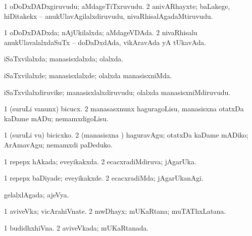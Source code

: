 \bentry
{} 
\gl{\nA}
\expl{}
\bmng
\bnum
\num{1} oDoDxDADxgiruvudu; aMdageTiTxruvudu. 
\num{2} anivARhayxte; baLakege, hiDitakekx -- anukUlavAgilalxdiruvudu, nivaRhisalAgadaMtiruvudu. 
\enum
\emng
\eentry

\bentry
{} 
\gl{\gu}
\bmng
\bnum
\num{1} oDoDxDADxda; nAjUkilalxda; aMdageVDAda. 
\num{2} nivaRhisalu anukUlavalalxdaSuTx -- doDaDxdAda, vikAravAda yA tUkavAda. 
\enum
\emng
\eentry

\bentry
{} 
\gl{\gu}
\expl{}
\bmng
iSaTxvilalxda; manasisxlalxda; olalxda. 
\emng
\eentry

\bentry
{} 
\gl{\kirxvi}
\expl{}
\bmng
iSaTxvilalxde; manasisxlalxde; olalxda manasisxniMda. 
\emng
\eentry

\bentry
{} 
\gl{\nA}
\expl{}
\bmng
iSaTxvilalxdiruvike; manasisxlalxdiruvudu; olalxda manasisxniMdiruvudu. 
\emng
\eentry

\bentry
{} 
\gl{\kirx}


\noindent
\gl{\sakirx}
\expl{}
\bmng
\bnum
\num{1} (suruLi \mo vanunx) bicucx. 
\num{2} manasasxnunx haguragoLisu, manasisxna otatxDa kaDame mADu; nemamxdigoLisu. 
\enum
\emng

\noindent
\gl{\akirx}
\expl{}
\bmng
\bnum
\num{1} (suruLi \mo vu) bicicxko. 
\num{2} (manasisxna \vi) haguravAgu; otatxDa kaDame mADiko; ArAmavAgu; nemamxdi paDeduko. 
\enum
\emng
\eentry

\bentry
{} 
\gl{\gu}
\expl{}
\bmng
\bnum
\num{1} repepx hAkada; eveyikakxda. 
\num{2} ecacxradiMdiruva; jAgarUka. 
\enum
\emng
\eentry

\bentry
{} 
\gl{\kirxvi}
\expl{}
\bmng
\bnum
\num{1} repepx baDiyade; eveyikakxde. 
\num{2} ecacxradiMda; jAgarUkanAgi. 
\enum
\emng
\eentry

\bentry
{} 
\gl{\gu}
\expl{}
\bmng
gelalxlAgada; ajeVya. 
\emng
\eentry

\bentry
{} 
\gl{\nA}
\expl{}
\bmng
\bnum
\num{1} aviveVka; vicArahiVnate. 
\num{2} mwDhayx; mUKaRtana; muTAThxLatana. 
\enum
\emng
\eentry

\bentry
{} 
\gl{\gu}
\expl{}
\bmng
\bnum
\num{1} budidhxhiVna. 
\num{2} aviveVkada; mUKaRtanada. 
\enum
\emng
\eentry

